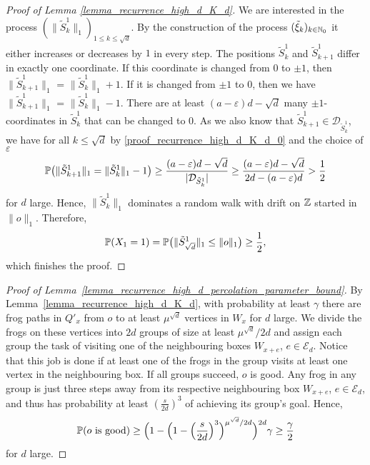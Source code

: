 \begin{proof}[Proof of Lemma \ref{lemma_recurrence_high_d_K_d}]
We are interested in the process $(\lVert \tilde{S}_k^1 \rVert_1)_{1 \leq k \leq \sqrt{d}}$. By the construction of the process $(\tilde{\xi}_k)_{k \in \N_0}$ it either increases or decreases by $1$ in every step. The positions $\tilde{S}_k^1$ and $\tilde{S}_{k+1}^1$ differ in exactly one coordinate. If this coordinate is changed from $0$ to $\pm 1$, then $\lVert \tilde{S}_{k+1}^1\rVert_1$ = $\lVert \tilde{S}_k^1 \rVert_1 +1$. If it is changed from $\pm 1$ to $0$, then we have $\lVert \tilde{S}_{k+1}^1\rVert_1$ = $\lVert \tilde{S}_k^1 \rVert_1 -1$. There are at least $(a-\varepsilon)d-\sqrt{d}$ many $\pm 1$-coordinates in $\tilde{S}_k^1$ that can be changed to $0$. As we also know that $\tilde{S}_{k+1}^1 \in \mathcal{D}_{\tilde{S}_k^1}$, we have for all $k \leq \sqrt{d}$ by \eqref{proof_recurrence_high_d_K_d_0} and the choice of $\varepsilon$
\begin{equation*}
 \P\bigl(\lVert \tilde{S}_{k+1}^1\rVert_1 = \lVert \tilde{S}_k^1 \rVert_1 -1\bigr) 
	\geq \frac{(a-\varepsilon)d-\sqrt{d}}{\lvert\mathcal{D}_{\tilde{S}_k^1}\rvert} 
	\geq \frac{(a-\varepsilon)d - \sqrt{d}}{2d - (a-\varepsilon)d} 
	> \frac12
\end{equation*}
for $d$ large. Hence, $\lVert \tilde{S}_k^1 \rVert_1$ dominates a random walk with drift on $\Z$ started in $\lVert o \rVert_1$. Therefore, 
\begin{equation*}
\P(X_1 = 1) = \P\bigl(\lVert \tilde{S}_{\sqrt{d}}^1 \rVert_1 \leq \lVert o \rVert_1\bigr) \geq \frac12,
\end{equation*}
which finishes the proof.
\end{proof}


\begin{proof}[Proof of Lemma~\ref{lemma_recurrence_high_d_percolation_parameter_bound}]
By Lemma~\ref{lemma_recurrence_high_d_K_d}, with probability at least $\gamma$ there are frog paths in $Q'_x$ from $o$ to at least $\mu^{\sqrt{d}}$ vertices in $W_x$ for $d$ large. We divide the frogs on these vertices into $2d$ groups of size at least $\mu^{\sqrt{d}}/2d$ and assign each group the task of visiting one of the neighbouring boxes $W_{x+e}$, $e \in \mathcal{E}_d$. Notice that this job is done if at least one of the frogs in the group visits at least one vertex in the neighbouring box. If all groups succeed, $o$ is good. Any frog in any group is just three steps away from its respective neighbouring box $W_{x+e}$, $e \in \mathcal{E}_d$, and thus has probability at least $(\frac{s}{2d})^3$ of achieving its group's goal. Hence,
\begin{equation*}
\P(\text{$o$ is good}) \geq  \Bigl(1- \Bigl(1-\Bigl(\frac{s}{2d}\Bigr)^3\Bigr)^{\mu^{\sqrt d}/{2d}} \Bigr)^{2d} \gamma 
                       \geq \frac{\gamma}{2}
\end{equation*}
for $d$ large.  
\end{proof}

